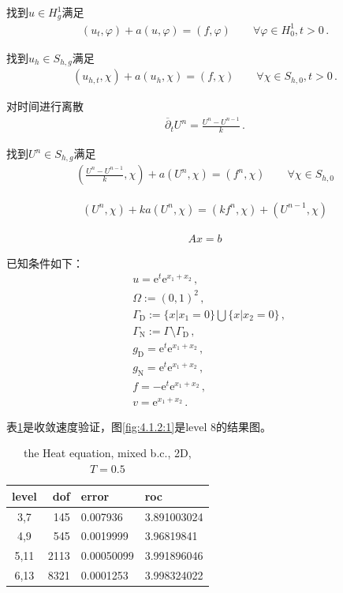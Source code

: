 找到$u\in H^1_g$满足
\begin{align}		   
  (u_t,\varphi) + a(u,\varphi)=(f,\varphi) \qquad \forall \varphi\in H^1_0, t>0\,.
\end{align}

找到$u_h\in S_{h,g}$满足
\begin{align}		   
  (u_{h,t},\chi) + a(u_h,\chi)=(f,\chi) \qquad \forall \chi\in S_{h,0}, t>0\,.
\end{align}

对时间进行离散
\begin{align}
   \overline\partial_t U^n = \frac{U^n - U^{n-1}}{k}\,.
\end{align}

找到$U^n\in S_{h,g}$满足
\begin{align}
  \left(\frac{U^n - U^{n-1}}{k},\chi\right) + a(U^n,\chi)=(f^n,\chi) \qquad \forall \chi\in S_{h,0}
\end{align}

\begin{align}
  \left(U^n,\chi\right) + ka(U^n,\chi)=(kf^n,\chi) + \left(U^{n-1},\chi\right)
\end{align}

\begin{align}
  Ax = b
\end{align}

已知条件如下：
\begin{subequations}	   
  \begin{align*}	      
   &u=\mathrm e^t \mathrm e^{x_1+x_2}\,,\\
   &\Omega:=(0,1)^2\,,\\
   &\Gamma_{\mathrm D}:=\{x|x_1=0\}\bigcup\{x|x_2=0\}\,,\\
   &\Gamma_{\mathrm N}:=\Gamma\setminus\Gamma_{\mathrm D}\,, \\
   &g_{\mathrm D}=\mathrm e^t \mathrm e^{x_1+x_2}\,,\\
   &g_{\mathrm N}=\mathrm e^t \mathrm e^{x_1+x_2}\,,\\
   &f=-\mathrm e^t \mathrm e^{x_1+x_2}\,,\\
    &v=\mathrm e^{x_1+x_2}\,.
  \end{align*}
\end{subequations}	   

表\ref{tab:4.1.2:1}是收敛速度验证，图\ref{fig:4.1.2:1}是level 8的结果图。

\begin{table}[!htbp]\label{tab:4.1.2:1}
  \centering
  \begin{tabular}{c|r|l|l}
    level     &     dof      &      error  &         roc \\
    \hline
    3,7     &        145     &      0.007936  &      3.891003024 \\
    \hline
    4,9   &         545       &    0.0019999 &      3.96819841 \\
    \hline
    5,11  &         2113   &       0.00050099  &    3.991896046 \\
    \hline
    6,13  &         8321  &        0.0001253   &    3.998324022 
  \end{tabular}
  \caption{the Heat equation, mixed b.c., 2D, $T=0.5$}
\end{table}

